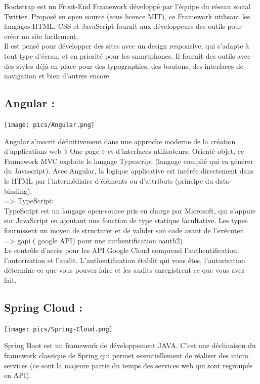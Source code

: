 Bootstrap est un Front-End Framework développé par l'équipe du réseau social Twitter. Proposé en open source (sous licence MIT), ce Framework utilisant les langages HTML, CSS et JavaScript fournit aux développeurs des outils pour créer un site facilement. \\

Il est pensé pour développer des sites avec un design responsive, qui s'adapte à tout type d'écran, et en priorité pour les smartphones. Il fournit des outils avec des styles déjà en place pour des typographies, des boutons, des interfaces de navigation et bien d'autres encore.  \\

\subsection{Angular :}
\begin{center}
\texttt{[image: pics/Angular.png]}    
\end{center}
Angular s’inscrit définitivement dans une approche moderne de la création d’applications web « One page » et d’interfaces utilisateurs. Orienté objet, ce Framework MVC exploite le langage Typescript (langage compilé qui va générer du Javascript). Avec Angular, la logique applicative est insérée directement dans le HTML par l’intermédiaire d’éléments ou d’attributs (principe du data-binding).\\

            => TypeScript:\\
TypeScript est un langage open-source pris en charge par Microsoft, qui s’appuie sur JavaScript en ajoutant une fonction de type statique facultative. Les types fournissent un moyen de structurer et de valider son code avant de l’exécuter. \\

            => gapi ( google API) pour une authentification oauth2) \\
Le contrôle d'accès pour les API Google Cloud comprend l'authentification, l'autorisation et l'audit. L'authentification établit qui vous êtes, l'autorisation détermine ce que vous pouvez faire et les audits enregistrent ce que vous avez fait. \\


\subsection{Spring Cloud :}

\begin{center}
\texttt{[image: pics/Spring-Cloud.png]}    
\end{center}
Spring Boot est un framework de développement JAVA. C'est une déclinaison du framework classique de Spring qui permet essentiellement de réaliser des micro services (ce sont la majeure partie du temps des services web qui sont regroupés en API). \\

